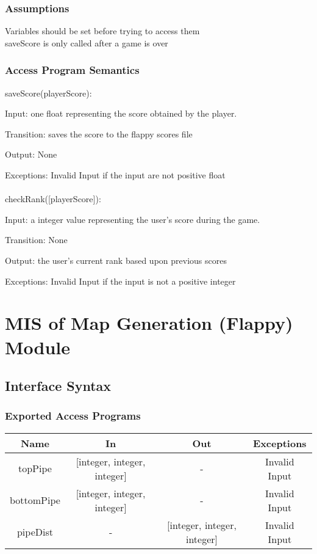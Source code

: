 \documentclass[12pt, titlepage]{article}
\begin{document}
		\subsubsection{Assumptions}
		Variables should be set before trying to access them \\
		saveScore is only called after a game is over
		
		\subsubsection{Access Program Semantics}
		saveScore(playerScore):
		
		Input: one float representing the score obtained by the player. 
		
		Transition: saves the score to the flappy scores file
		
		Output: None
		
		Exceptions: Invalid Input if the input are not positive float \\
		\\
		checkRank([playerScore]):
		
		Input: a integer value representing the user's score during the game.
		
		Transition: None
		
		Output: the user's current rank based upon previous scores
		
		Exceptions: Invalid Input if the input is not a positive integer
		
\section{MIS of Map Generation (Flappy) Module}
		\subsection{Interface Syntax}
		\subsubsection{Exported Access Programs}
		\begin{tabular}[pos]{|c|c|c|c|}
			\hline
			\textbf{Name}& \textbf{In} & \textbf{Out} & \textbf{Exceptions} \\ \hline
			topPipe & [integer, integer, integer] & - & Invalid Input \\ \hline
			bottomPipe & [integer, integer, integer] & - & Invalid Input \\ \hline
			pipeDist & - & [integer, integer, integer] & Invalid Input \\ \hline
			
		\end{tabular}
		
\end{document}
